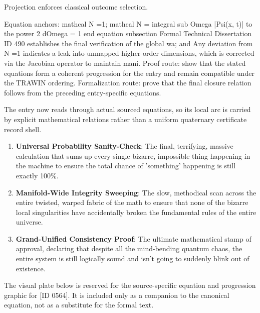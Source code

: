 Projection enforces classical outcome selection.

Equation anchors: mathcal N =1; mathcal N = integral sub Omega |Psi(x, t)| to the power 2 dOmega = 1 end equation subsection Formal Technical Dissertation ID 490 establishes the final verification of the global wa; and Any deviation from N =1 indicates a leak into unmapped higher-order dimensions, which is corrected via the Jacobian operator to maintain mani. Proof route: show that the stated equations form a coherent progression for the entry and remain compatible under the TRAWIN ordering. Formalization route: prove that the final closure relation follows from the preceding entry-specific equations.

The entry now reads through actual sourced equations, so its local arc is carried by explicit mathematical relations rather than a uniform quaternary certificate record shell.
\endgroup

\begin{enumerate}[leftmargin=1.6em,itemsep=6pt,topsep=4pt]
\item \textbf{Universal Probability Sanity-Check}: The final, terrifying, massive calculation that sums up every single bizarre, impossible thing happening in the machine to ensure the total chance of 'something' happening is still exactly 100\%.
\item \textbf{Manifold-Wide Integrity Sweeping}: The slow, methodical scan across the entire twisted, warped fabric of the math to ensure that none of the bizarre local singularities have accidentally broken the fundamental rules of the entire universe.
\item \textbf{Grand-Unified Consistency Proof}: The ultimate mathematical stamp of approval, declaring that despite all the mind-bending quantum chaos, the entire system is still logically sound and isn't going to suddenly blink out of existence.
\end{enumerate}

\begingroup\footnotesize\sloppy
The visual plate below is reserved for the source-specific equation and progression graphic for [ID 0564]. It is included only as a companion to the canonical equation, not as a substitute for the formal text.
\par\endgroup
\ifTZPDarkEdition
{}
\fi

